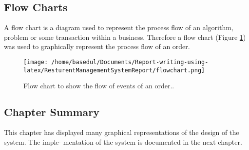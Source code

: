 \documentclass[12pt,a4paper]{article}
\begin{document}
\subsection{Flow Charts}
	A flow chart is a diagram used to represent the process flow of an algorithm, problem or some transaction
within a business. Therefore a flow chart (Figure \ref{fig:flowchart}) was used to graphically represent the process
flow of an order.
\begin{figure}[H]
		\centering
		\texttt{[image: /home/basedul/Documents/Report-writing-using-latex/ResturentManagementSystemReport/flowchart.png]}
		\caption{Flow chart to show the flow of events of an order..}
		\label{fig:flowchart} 
\end{figure}
\subsection{Chapter Summary}
	This chapter has displayed many graphical representations of the design of the system. The imple-
mentation of the system is documented in the next chapter.
\newpage


\end{document}
